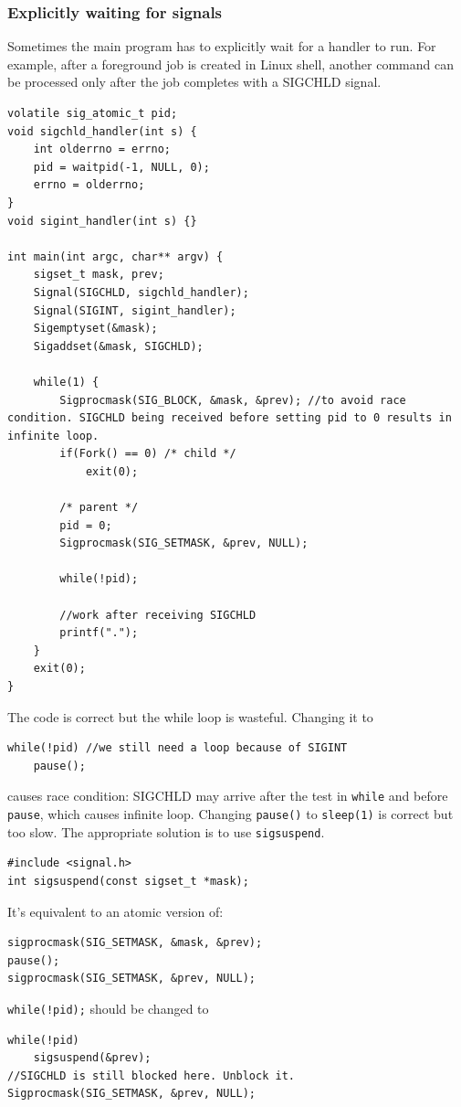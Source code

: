 \subsubsection{Explicitly waiting for signals}
Sometimes the main program has to explicitly wait for a handler to run. For example, after a foreground job is created in Linux shell, another command can be processed only after the job completes with a SIGCHLD signal. 
\begin{lstlisting}[frame=single]
volatile sig_atomic_t pid;
void sigchld_handler(int s) {
	int olderrno = errno;
	pid = waitpid(-1, NULL, 0);
	errno = olderrno;
}
void sigint_handler(int s) {}

int main(int argc, char** argv) {
	sigset_t mask, prev;
	Signal(SIGCHLD, sigchld_handler);
	Signal(SIGINT, sigint_handler);
	Sigemptyset(&mask);
	Sigaddset(&mask, SIGCHLD);

	while(1) {
		Sigprocmask(SIG_BLOCK, &mask, &prev); //to avoid race condition. SIGCHLD being received before setting pid to 0 results in infinite loop.
		if(Fork() == 0) /* child */
			exit(0);

		/* parent */
		pid = 0;
		Sigprocmask(SIG_SETMASK, &prev, NULL);

		while(!pid);

		//work after receiving SIGCHLD
		printf(".");
	}
	exit(0);
}
\end{lstlisting}
The code is correct but the while loop is wasteful. Changing it to 
\begin{lstlisting}[frame=single]
while(!pid) //we still need a loop because of SIGINT
	pause();
\end{lstlisting}
causes race condition: SIGCHLD may arrive after the test in \texttt{while} and before \texttt{pause}, which causes infinite loop. Changing \texttt{pause()} to \texttt{sleep(1)} is correct but too slow. The appropriate solution is to use \texttt{sigsuspend}.
\begin{lstlisting}[frame=single]
#include <signal.h>
int sigsuspend(const sigset_t *mask);
\end{lstlisting}
It's equivalent to an atomic version of:
\begin{lstlisting}[frame=single]
sigprocmask(SIG_SETMASK, &mask, &prev);
pause();
sigprocmask(SIG_SETMASK, &prev, NULL);
\end{lstlisting}
\texttt{while(!pid);} should be changed to
\begin{lstlisting}[frame=single]
while(!pid)
	sigsuspend(&prev);
//SIGCHLD is still blocked here. Unblock it.
Sigprocmask(SIG_SETMASK, &prev, NULL);
\end{lstlisting}
